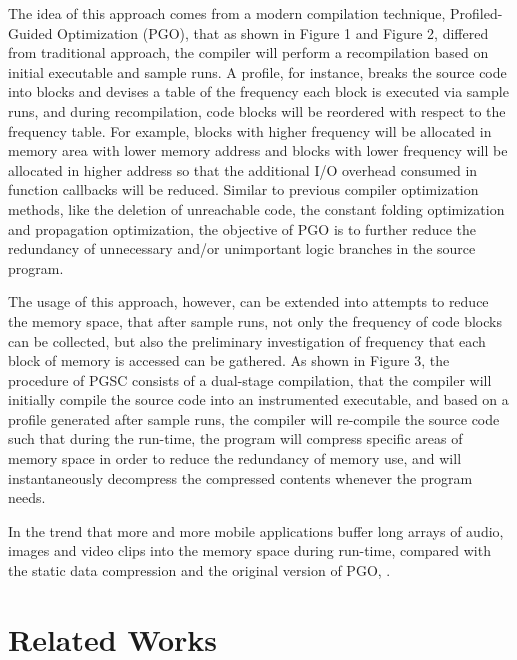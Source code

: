 \documentclass[]{article}
\begin{document}
The idea of this approach comes from a modern compilation technique, Profiled-Guided Optimization (PGO), that as shown in Figure 1 and Figure 2, differed from traditional approach, the compiler will perform a recompilation based on initial executable and sample runs. A profile, for instance, breaks the source code into blocks and devises a table of the frequency each block is executed via sample runs, and during recompilation, code blocks will be reordered with respect to the frequency table. For example, blocks with higher frequency will be allocated in memory area with lower memory address and blocks with lower frequency will be allocated in higher address so that the additional I/O overhead consumed in function callbacks will be reduced. Similar to previous compiler optimization methods, like the deletion of unreachable code, the constant folding optimization and propagation optimization, the objective of PGO is to further reduce the redundancy of unnecessary and/or unimportant logic branches in the source program. \par 
The usage of this approach, however, can be extended into attempts to reduce the memory space, that after sample runs, not only the frequency of code blocks can be collected, but also the preliminary investigation of frequency that each block of memory is accessed can be gathered. As shown in Figure 3, the procedure of PGSC consists of a dual-stage compilation, that the compiler will initially compile the source code into an instrumented executable, and based on a profile generated after sample runs, the compiler will re-compile the source code such that during the run-time, the program will compress specific areas of memory space in order to reduce the redundancy of memory use, and will instantaneously decompress the compressed contents whenever the program needs. \par 
In the trend that more and more mobile applications buffer long arrays of audio, images and video clips into the memory space during run-time, compared with the static data compression and the original version of PGO, .

\section{Related Works}

\printbibliography
\end{document}
